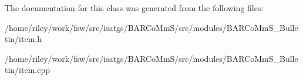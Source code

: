 The documentation for this class was generated from the following files\+:\begin{DoxyCompactItemize}
\item 
/home/riley/work/fsw/src/isatgs/\+B\+A\+R\+Co\+Mm\+S/src/modules/\+B\+A\+R\+Co\+Mm\+S\+\_\+\+Bulletin/item.\+h\item 
/home/riley/work/fsw/src/isatgs/\+B\+A\+R\+Co\+Mm\+S/src/modules/\+B\+A\+R\+Co\+Mm\+S\+\_\+\+Bulletin/item.\+cpp\end{DoxyCompactItemize}
